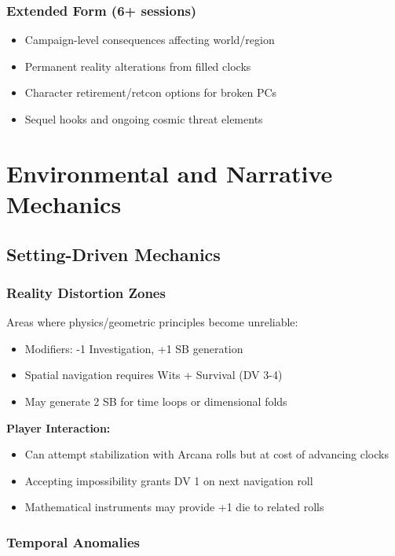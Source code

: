 \documentclass[11pt]{article}
\begin{document}
\subsubsection{Extended Form (6+ sessions)}

\begin{itemize}
\item Campaign-level consequences affecting world/region
\item Permanent reality alterations from filled clocks
\item Character retirement/retcon options for broken PCs
\item Sequel hooks and ongoing cosmic threat elements
\end{itemize}

\section{Environmental and Narrative Mechanics}

\subsection{Setting-Driven Mechanics}

\subsubsection{Reality Distortion Zones}

Areas where physics/geometric principles become unreliable:
\begin{itemize}
\item Modifiers: -1 Investigation, +1 SB generation
\item Spatial navigation requires Wits + Survival (DV 3-4)
\item May generate 2 SB for time loops or dimensional folds
\end{itemize}

\textbf{Player Interaction:}
\begin{itemize}
\item Can attempt stabilization with Arcana rolls but at cost of advancing clocks
\item Accepting impossibility grants DV 1 on next navigation roll
\item Mathematical instruments may provide +1 die to related rolls
\end{itemize}

\subsubsection{Temporal Anomalies}
\end{document}
